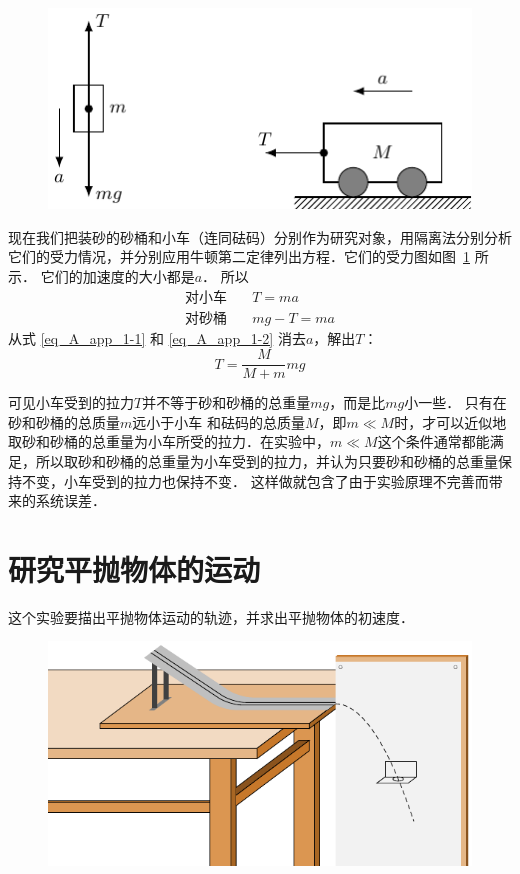 \begin{figure}[htbp]
    \centering
    \includegraphics{fig/A/10-11.pdf}
    \caption{}\label{fig_A_10-11}
\end{figure}

现在我们把装砂的砂桶和小车（连同砝码）分别作为研究对象，用隔离法分别分析它们的受力情况，并分别应用牛顿第二定律列出方程．它们的受力图如图~\ref{fig_A_10-11} 所示．
它们的加速度的大小都是$a$．
所以
\begin{align}
    \text{对小车}&\quad T=ma \label{eq_A_app_1-1} \\
    \text{对砂桶}&\quad mg-T=ma \label{eq_A_app_1-2}
\end{align}
从式 \eqref{eq_A_app_1-1} 和 \eqref{eq_A_app_1-2} 消去$a$，解出$T$：
\begin{equation}\label{eq_A_app_1-3}
    T=\frac{M}{M+m}mg
\end{equation}

可见小车受到的拉力$T$并不等于砂和砂桶的总重量$mg$，而是比$mg$小一些．
只有在砂和砂桶的总质量$m$远小于小车
和砝码的总质量$M$，即$m\ll M$时，才可以近似地取砂和砂桶的总重量为小车所受的拉力．在实验中，$m\ll M$这个条件通常都能满足，所以取砂和砂桶的总重量为小车受到的拉力，并认为只要砂和砂桶的总重量保持不变，小车受到的拉力也保持不变．
这样做就包含了由于实验原理不完善而带来的系统误差．

\section{研究平抛物体的运动}

这个实验要描出平抛物体运动的轨迹，并求出平抛物体的初速度．
\begin{figure}[htbp]
    \centering
    \includegraphics{fig/A/10-12.pdf}
    \caption{}\label{fig_A_10-12}
    \end{figure}

